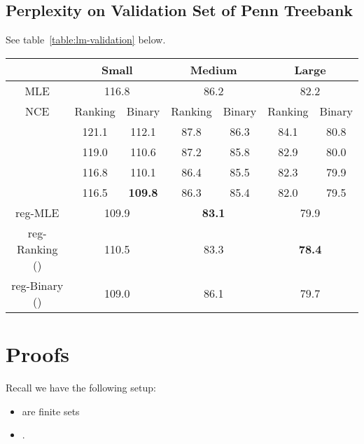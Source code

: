 \documentclass[11pt,a4paper]{article}
\begin{document}
\subsection{Perplexity on Validation Set of Penn Treebank}
\label{sec:exp-validation}
See table~\ref{table:lm-validation} below.
\begin{table*}[t!]
\centering
\begin{tabular}{|c|c|c|c|c|c|c|}
\hline
&   \multicolumn{2}{|c|}{Small}  &  \multicolumn{2}{|c|}{Medium}  &  \multicolumn{2}{|c|}{Large} \\
\hline
MLE
  &  \multicolumn{2}{|c|}{116.8} & \multicolumn{2}{|c|}{86.2}   & \multicolumn{2}{|c|}{82.2}\\
  \hline
 NCE   &Ranking &Binary     &Ranking &Binary   &Ranking &Binary   \\
 \hline
   & 121.1 & 112.1     & 87.8  & 86.3    & 84.1  &80.8   \\
\hline
   & 119.0 & 110.6     & 87.2  & 85.8    & 82.9  &80.0   \\
\hline
   & 116.8 & 110.1     & 86.4  & 85.5    & 82.3  &79.9   \\
\hline
  & 116.5 & \textbf{109.8} & 86.3  & 85.4   & 82.0  &79.5   \\
\hline
reg-MLE      & \multicolumn{2}{|c|}{109.9}   &\multicolumn{2}{|c|}{\textbf{83.1}}     & \multicolumn{2}{|c|}{79.9} \\
\hline
reg-Ranking ()  & \multicolumn{2}{|c|}{110.5}   &\multicolumn{2}{|c|}{83.3}     & \multicolumn{2}{|c|}{\textbf{78.4}} \\
\hline
reg-Binary ()  & \multicolumn{2}{|c|}{109.0}  &\multicolumn{2}{|c|}{86.1}     & \multicolumn{2}{|c|}{79.7} \\
\hline
\end{tabular}
\caption{Perplexity on the validation set. We show performance for
the Ranking vs. Binary loss algorithms, with different values for ,
and with/without regularization.}
\label{table:lm-validation}
\end{table*}



\section{Proofs}
\label{sec:supplemental}
Recall we have the following setup: 
\begin{itemize}
  \item  are finite sets
  \item .
\end{itemize}
\end{document}

